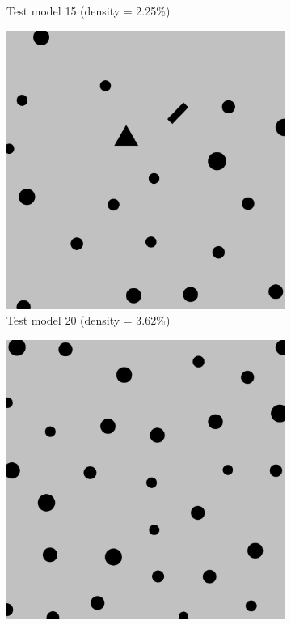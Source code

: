 \documentclass[francais,RandD]{rapportPFE}
\begin{document}
\begin{figure}[h!]
\begin{subfigure}[t]{0.3\linewidth}
					\caption{Test model 15 (density = 2.25\%)}
					\label{fig:test_model_15}
			\end{subfigure}
			\hfill
			\begin{subfigure}[t]{0.3\linewidth}
					\includegraphics[width=\linewidth]{graphics/test_model_20.png}
					\caption{Test model 20 (density = 3.62\%)}
					\label{fig:test_model_20}
			\end{subfigure}
			\hfill
			\begin{subfigure}[t]{0.3\linewidth}
					\includegraphics[width=\linewidth]{graphics/test_model_30.png}

\end{subfigure}
\end{figure}
\end{document}
